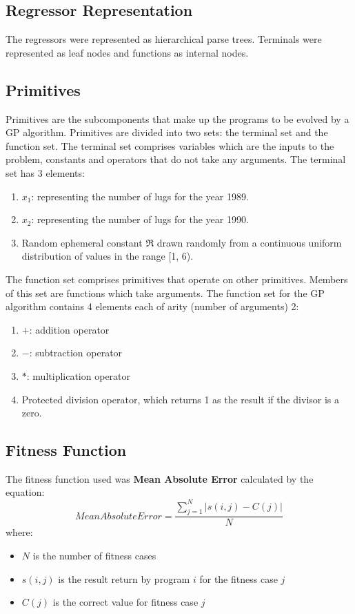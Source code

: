 \documentclass[a4paper,12pt]{article}
\begin{document}
\subsection{Regressor Representation}
The regressors were represented as hierarchical parse trees. Terminals were represented as leaf nodes and functions as internal nodes.
\subsection{Primitives}
Primitives are the subcomponents that make up the programs to be evolved by a GP algorithm.
Primitives are divided into two sets: the terminal set and the function set.
The terminal set comprises variables which are the inputs to the problem, constants and operators that do not take any arguments. The terminal set has 3 elements:
\begin{enumerate}
    \item $x_1$: representing the number of lugs for the year 1989.
    \item $x_2$: representing the number of lugs for the year 1990.
    \item Random ephemeral constant $\mathfrak{R}$ drawn randomly from a continuous uniform distribution of values in the range [1, 6).
\end{enumerate}

The function set comprises primitives that operate on other primitives. Members of this set are functions which take arguments. The function set for the GP algorithm contains 4 elements each of arity (number of arguments) 2:
\begin{enumerate}
    \item $+$: addition operator
    \item $-$: subtraction operator
    \item $*$: multiplication operator
    \item Protected division operator, which returns 1 as the result if the divisor is a zero.
\end{enumerate}
\subsection{Fitness Function}
The fitness function used was \textbf{Mean Absolute Error} calculated by the equation:
\begin{equation}
    Mean Absolute Error = \frac{\sum_{j=1}^{N}|s(i, j) - C(j)|}{N}
\end{equation}
where:
\begin{itemize}
    \item $N$ is the number of fitness cases
    \item $s(i, j)$ is the result return by program $i$ for the fitness case $j$
    \item $C(j)$ is the correct value for fitness case $j$
\end{itemize}
\end{document}
